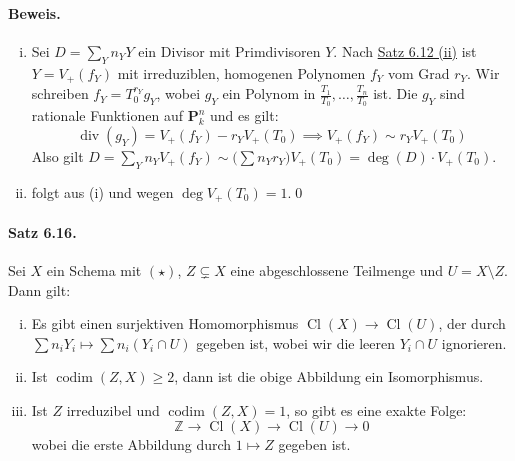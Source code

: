 \paragraph{Beweis.} \begin{enumerate}[(i)]
\item Sei $D=\sum_Y n_YY$ ein Divisor mit Primdivisoren $Y$. Nach \hyperref[6.12]{Satz 6.12 (ii)} ist $Y=V_+(f_Y)$ mit irreduziblen, homogenen Polynomen $f_Y$ vom Grad $r_Y$. Wir schreiben $f_Y=T_0^{r_Y} g_Y$, wobei $g_Y$ ein Polynom in $\frac{T_1}{T_0},\ldots,\frac{T_n}{T_0}$ ist. Die $g_Y$ sind rationale Funktionen auf $\mathbf{P}_k^n$ und es gilt:
\[\operatorname{div}(g_Y) = V_+(f_Y)-r_YV_+(T_0) \implies V_+(f_Y)\sim r_YV_+(T_0) \]
Also gilt $D=\sum_Yn_Y V_+(f_Y)\sim \big(\sum n_Y r_Y\big) V_+(T_0) = \deg(D)\cdot V_+(T_0)$.
\item folgt aus (i) und wegen $\deg V_+(T_0)=1$.\qed
\end{enumerate}

\paragraph{Satz 6.16.}\label{6.16} Sei $X$ ein Schema mit $(\star)$, $Z\subsetneq X$ eine abgeschlossene Teilmenge und $U=X\setminus Z$. Dann gilt:
\begin{enumerate}[(i)]
\item Es gibt einen surjektiven Homomorphismus $\operatorname{Cl}(X)\to\operatorname{Cl}(U)$, der durch $\sum n_iY_i\mapsto \sum n_i(Y_i\cap U)$ gegeben ist, wobei wir die leeren $Y_i\cap U$ ignorieren.
\item Ist $\operatorname{codim}(Z,X)\geq 2$, dann ist die obige Abbildung ein Isomorphismus.
\item Ist $Z$ irreduzibel und $\operatorname{codim}(Z,X)=1$, so gibt es eine exakte Folge:
\[\mathbb{Z}\to\operatorname{Cl}(X)\to\operatorname{Cl}(U)\to 0 \]
wobei die erste Abbildung durch $1\mapsto Z$ gegeben ist.
\end{enumerate}

